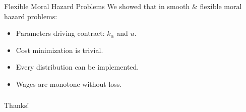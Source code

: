 \documentclass[xcolor=x11names,compress]{beamer}
\renewcommand{\(}{\begin{columns}}
\renewcommand{\)}{\end{columns}}
\newcommand{\<}[1]{\begin{column}{#1}}
\renewcommand{\>}{\end{column}}
\begin{document}
\begin{frame}{Flexible Moral Hazard Problems}
We showed that in smooth \& flexible moral hazard problems:\medskip
\begin{itemize}
\item Parameters driving contract: $k_\alpha$ and $u$.\medskip
\item Cost minimization is trivial. \medskip
\item Every distribution can be implemented. \medskip
\item Wages are monotone without loss. \bigskip
\end{itemize}
\end{frame}


\begin{frame}
	\frametitle{}
	\begin{center}
		{\color{darkblue} {\huge Thanks!}}
	\end{center}
\end{frame}
\end{document}
